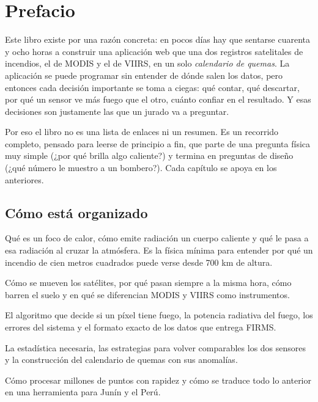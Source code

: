 \chapter{Prefacio}

Este libro existe por una razón concreta: en pocos días hay que sentarse cuarenta y ocho horas
a construir una aplicación web que una dos registros satelitales de incendios, el de MODIS y el
de VIIRS, en un solo \emph{calendario de quemas}. La aplicación se puede programar sin entender
de dónde salen los datos, pero entonces cada decisión importante se toma a ciegas: qué contar,
qué descartar, por qué un sensor ve más fuego que el otro, cuánto confiar en el resultado. Y esas
decisiones son justamente las que un jurado va a preguntar.

Por eso el libro no es una lista de enlaces ni un resumen. Es un recorrido completo, pensado
para leerse de principio a fin, que parte de una pregunta física muy simple (¿por qué brilla
algo caliente?) y termina en preguntas de diseño (¿qué número le muestro a un bombero?). Cada
capítulo se apoya en los anteriores.

\section*{Cómo está organizado}

\begin{description}[leftmargin=1.2em,style=nextline]
  \item[Parte I. El fuego y la luz.] Qué es un foco de calor, cómo emite radiación un cuerpo
  caliente y qué le pasa a esa radiación al cruzar la atmósfera. Es la física mínima para
  entender por qué un incendio de cien metros cuadrados puede verse desde 700 km de altura.
  \item[Parte II. Satélites y sensores.] Cómo se mueven los satélites, por qué pasan siempre a
  la misma hora, cómo barren el suelo y en qué se diferencian MODIS y VIIRS como instrumentos.
  \item[Parte III. Del píxel al foco de calor.] El algoritmo que decide si un píxel tiene fuego,
  la potencia radiativa del fuego, los errores del sistema y el formato exacto de los datos que
  entrega FIRMS.
  \item[Parte IV. Armonizar dos registros.] La estadística necesaria, las estrategias para
  volver comparables los dos sensores y la construcción del calendario de quemas con sus
  anomalías.
  \item[Parte V. Hacia la aplicación.] Cómo procesar millones de puntos con rapidez y cómo se
  traduce todo lo anterior en una herramienta para Junín y el Perú.
\end{description}

